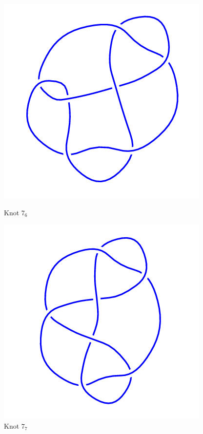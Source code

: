 \documentclass{article}
\begin{document}
\begin{figure}[!htb]
\includegraphics[width=\linewidth]{7_6.png}
\caption{Knot $7_6$}
\endminipage\hfill
{}
\includegraphics[width=\linewidth]{7_7.png}
\caption{Knot $7_7$}
\endminipage\hfill
\end{figure}
\end{document}
